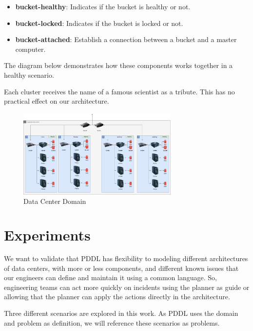 \documentclass[letterpaper]{article}
\begin{document}
\begin{itemize}
    \item \textbf{bucket-healthy}: Indicates if the bucket is healthy or not.
    \item \textbf{bucket-locked}: Indicates if the bucket is locked or not.
    \item \textbf{bucket-attached}: Establish a connection between a bucket and a master computer.
\end{itemize}

The diagram below demonstrates how these components works together in a healthy scenario.

Each cluster receives the name of a famous scientist as a tribute. This has no practical effect on our architecture.

\begin{figure}[ht]
    \centering
    \includegraphics[width=8cm]{images/diagrams-healthy.png}
    \caption{Data Center Domain}
    \label{fig:data-center-domain}
\end{figure}

\section{Experiments}\label{sec:experiments}

We want to validate that PDDL has flexibility to modeling different architectures of data centers, with more or less components, and different known issues that our engineers can define and maintain it using a common language. So, engineering teams can act more quickly on incidents using the planner as guide or allowing that the planner can apply the actions directly in the architecture.

Three different scenarios are explored in this work. As PDDL uses the domain and problem as definition, we will reference these scenarios as problems.
\end{document}
